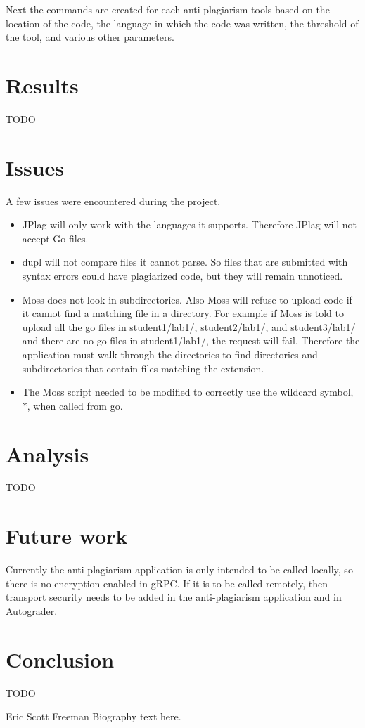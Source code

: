 \documentclass[10pt,journal,compsoc]{IEEEtran}
\begin{document}
			Next the commands are created for each anti-plagiarism tools based on the location of the code, the language in which the code was written, the threshold of the tool, and various other parameters.
	
	\section{Results}
	TODO
	
	\section{Issues}
	A few issues were encountered during the project.
	\begin{itemize}
		\item JPlag will only work with the languages it supports. Therefore JPlag will not accept Go files. 
		\item dupl will not compare files it cannot parse. So files that are submitted with syntax errors could have plagiarized code, but they will remain unnoticed.
		\item Moss does not look in subdirectories. Also Moss will refuse to upload code if it cannot find a matching file in a directory. For example if Moss is told
		to upload all the go files in student1/lab1/, student2/lab1/, and student3/lab1/ and there are no go files in student1/lab1/, the request will fail. Therefore
		the application must walk through the directories to find directories and subdirectories that contain files matching the extension.
		\item The Moss script needed to be modified to correctly use the wildcard symbol, $*$, when called from go.
	\end{itemize}
	
	\section{Analysis}
	TODO
	
	\section{Future work}
	Currently the anti-plagiarism application is only intended to be called locally, so there is no encryption enabled in gRPC. If it is to be called remotely, then transport security needs to be added in the anti-plagiarism application and in Autograder.
	
	\section{Conclusion}
	TODO
	
	
	

\begin{IEEEbiographynophoto}{Eric Scott Freeman}
Biography text here.
\end{IEEEbiographynophoto}
\end{document}
